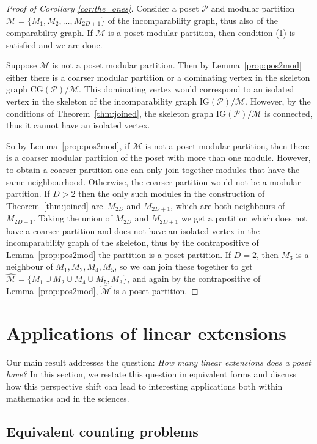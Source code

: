 \documentclass[9pt,a4paper,oneside]{article}
\newcommand{\cM}{\mathcal{M}}
\newcommand{\cP}{\mathcal{P}}
\newcommand{\CG}{\mathrm{CG}}
\newcommand{\IG}{\mathrm{IG}}
\begin{document}
\begin{proof}[Proof of Corollary \ref{cor:the_ones}]
Consider a poset $\cP$ and modular partition $\cM=\{M_1,M_2,\ldots,M_{2D+1}\}$ of the incomparability graph, thus also of the comparability graph. If $\cM$ is a poset modular partition, then condition (1) is satisfied and we are done. 

Suppose $\cM$ is not a poset modular partition. Then by Lemma~\ref{prop:pos2mod} either there is a coarser modular partition or a dominating vertex in the skeleton graph $\CG(\cP)/\cM$. This dominating vertex would correspond to an isolated vertex in the skeleton of the incomparability graph $\IG(\cP)/\cM$.  However,  by the conditions of Theorem~\ref{thm:joined}, the skeleton graph $\IG(\cP)/\cM$ is connected, thus it cannot have an isolated vertex.

So by Lemma~\ref{prop:pos2mod}, if $\cM$ is not a poset modular partition, then there is a coarser modular partition of the poset with more than one module. 
However, to obtain a coarser partition one can only join together modules that have the same neighbourhood. 
Otherwise, the coarser partition would not be a modular partition.
If $D>2$ then the only such modules in the construction of Theorem~\ref{thm:joined} are~$M_{2D}$ and $M_{2D+1}$, which are both neighbours of $M_{2D-1}$. Taking the union of $M_{2D}$ and $M_{2D+1}$ we get a partition which does not have a coarser partition and does not have an isolated vertex in the incomparability graph of the skeleton, thus by the contrapositive of Lemma~\ref{prop:pos2mod} the partition is a poset partition.
If $D=2$, then $M_3$ is a neighbour of $M_1,M_2,M_4,M_5$, so we can join these together to get $\widehat{\cM}=\{M_1\cup M_2\cup M_4\cup M_5,M_3\}$, and again by the contrapositive of Lemma~\ref{prop:pos2mod}, $\widehat{\cM}$ is a poset partition.
\end{proof}




\section{Applications of linear extensions}\label{sec:app}
Our main result addresses the question: \textit{How many linear extensions does a poset have?} In this section, we restate this question in equivalent forms 
and discuss how this perspective shift can lead to interesting applications both within mathematics and in the sciences. 


\subsection{Equivalent counting problems}
\end{document}
